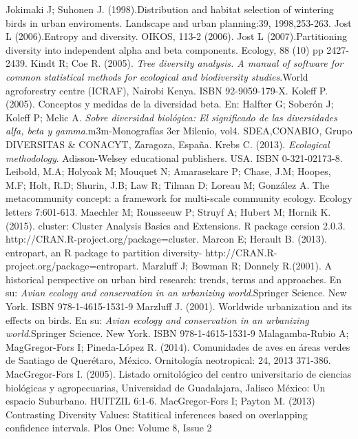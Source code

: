 \documentclass[letterpaper,12pt]{article}
\begin{document}
\begin{thebibliography}{37}
Jokimaki J; Suhonen J. (1998).Distribution and habitat selection of wintering birds in urban enviroments. Landscape and urban planning:39, 1998,253-263.
Jost L (2006).Entropy and diversity. OIKOS, 113-2 (2006).
Jost L (2007).Partitioning diversity into independent alpha and beta components. Ecology, 88 (10) pp 2427-2439.
Kindt R; Coe R. (2005). \textit{Tree diversity analysis. A manual of software for common statistical methods for ecological and biodiversity studies}.World agroforestry centre (ICRAF), Nairobi Kenya. ISBN 92-9059-179-X. 
\bibitem{}Koleff P.(2005). Conceptos y medidas de la diversidad beta. En: Halfter G; Soberón  J; Koleff P; Melic A. \textit{Sobre diversidad biológica: El significado de las diversidades alfa, beta y gamma}.m3m-Monografías 3er Milenio, vol4. SDEA,CONABIO, Grupo DIVERSITAS & CONACYT, Zaragoza, España.   
Krebs C. (2013). \textit{Ecological methodology}. Adisson-Welsey educational publishers. USA. ISBN 0-321-02173-8. 
\bibitem{}Leibold, M.A; Holyoak M; Mouquet N; Amarasekare P; Chase, J.M; Hoopes, M.F; Holt, R.D; Shurin, J.B; Law R; Tilman D; Loreau M; González A. The metacommunity concept: a framework for multi-scale community ecology. Ecology letters 7:601-613. 
\bibitem{}Maechler M; Rousseeuw P; Struyf A; Hubert M; Hornik K. (2015). cluster: Cluster Analysis Basics and Extensions. R package cersion 2.0.3. http://CRAN.R-project.org/package=cluster.
\bibitem{}Marcon E; Herault B. (2013). entropart, an R package to partition diversity- http://CRAN.R-project.org/package=entropart. 
\bibitem{}Marzluff J; Bowman R; Donnely R.(2001). A historical perspective on urban bird research: trends, terms and approaches. En su: \textit{Avian ecology and conservation in  an urbanizing world}.Springer Science. New York. ISBN 978-1-4615-1531-9
\bibitem{}Marzluff J. (2001). Worldwide urbanization and its effects on birds. En su: \textit{Avian ecology and conservation in  an urbanizing world}.Springer Science. New York. ISBN 978-1-4615-1531-9
Malagamba-Rubio A; MagGregor-Fors I; Pineda-López R. (2014). Comunidades de aves en áreas verdes de Santiago de Querétaro, México. Ornitología neotropical: 24, 2013 371-386.
MacGregor-Fors I. (2005). Listado ornitológico del centro universitario de ciencias biológicas y agropecuarias, Universidad de Guadalajara, Jalisco México: Un espacio Suburbano. HUITZIL 6:1-6.   
\bibitem{}MacGregor-Fors I; Payton M. (2013) Contrasting Diversity Values: Statitical inferences based on overlapping confidence intervals. Plos One: Volume 8, Issue 2

\end{thebibliography}
\end{document}
